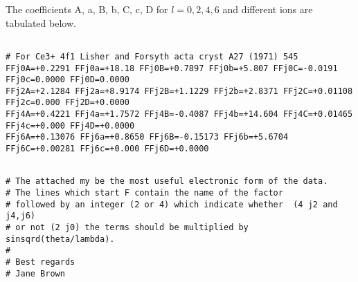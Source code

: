 The coefficients A, a, B, b, C, c, D for $l=0,2,4,6$ and different ions are tabulated below. 

{\footnotesize
\begin{verbatim}

# For Ce3+ 4f1 Lisher and Forsyth acta cryst A27 (1971) 545
FFj0A=+0.2291 FFj0a=+18.18 FFj0B=+0.7897 FFj0b=+5.807 FFj0C=-0.0191 FFj0c=0.0000 FFj0D=0.0000
FFj2A=+2.1284 FFj2a=+8.9174 FFj2B=+1.1229 FFj2b=+2.8371 FFj2C=+0.01108 FFj2c=0.000 FFj2D=+0.0000
FFj4A=+0.4221 FFj4a=+1.7572 FFj4B=-0.4087 FFj4b=+14.604 FFj4C=+0.01465 FFj4c=+0.000 FFj4D=+0.0000
FFj6A=+0.13076 FFj6a=+0.8650 FFj6B=-0.15173 FFj6b=+5.6704 FFj6C=+0.00281 FFj6c=+0.000 FFj6D=+0.0000
\end{verbatim}
\begin{verbatim}

# The attached my be the most useful electronic form of the data.
# The lines which start F contain the name of the factor
# followed by an integer (2 or 4) which indicate whether  (4 j2 and j4,j6)
# or not (2 j0) the terms should be multiplied by sinsqrd(theta/lambda).
#
# Best regards
# Jane Brown
\end{verbatim}
\begin{verbatim}


\end{verbatim}}
